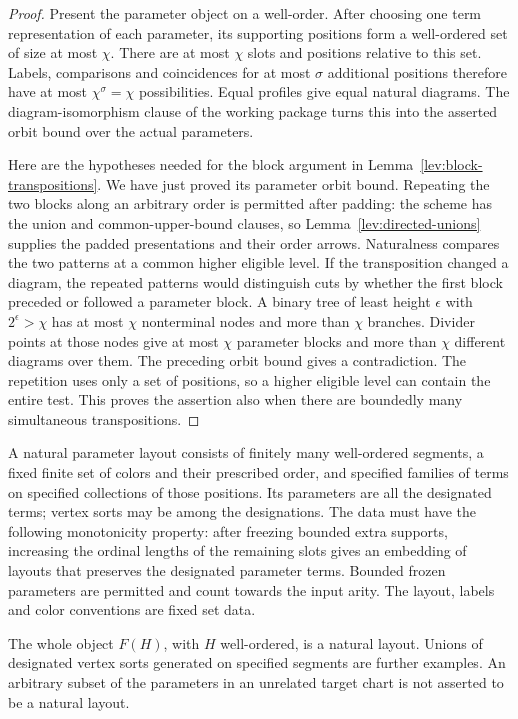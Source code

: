 \begin{proof}
Present the parameter object on a well-order.  After choosing one term
representation of each parameter, its supporting positions form a
well-ordered set of size at most $\chi$.  There are at most $\chi$ slots
and positions relative to this set.  Labels, comparisons and coincidences
for at most $\sigma$ additional positions therefore have at most
$\chi^\sigma=\chi$ possibilities.  Equal profiles give equal natural
diagrams.  The diagram-isomorphism clause of the working package turns
this into the asserted orbit bound over the actual parameters.

Here are the hypotheses needed for the block argument in
Lemma~\ref{lev:block-transpositions}.  We have just proved its parameter
orbit bound.  Repeating the two blocks along an arbitrary order is
permitted after padding: the scheme has the union and common-upper-bound
clauses, so Lemma~\ref{lev:directed-unions} supplies the padded
presentations and their order arrows.  Naturalness compares the two
patterns at a common higher eligible level.  If the transposition changed
a diagram, the repeated patterns would distinguish cuts by whether the
first block preceded or followed a parameter block.  A binary tree of
least height $\epsilon$ with $2^\epsilon>\chi$ has at most $\chi$
nonterminal nodes and more than $\chi$ branches.  Divider points at those
nodes give at most $\chi$ parameter blocks and more than $\chi$ different
diagrams over them.  The preceding orbit bound gives a contradiction.
The repetition uses only a set of positions, so a higher eligible level
can contain the entire test.  This proves the assertion also when there
are boundedly many simultaneous transpositions.
\end{proof}

\begin{definition}
\label{calc:natural-layout}
A natural parameter layout consists of finitely many well-ordered
segments, a fixed finite set of colors and their prescribed order, and
specified families of terms on specified collections of those positions.
Its parameters are all the designated terms; vertex sorts may be among
the designations.  The data must have the following monotonicity
property: after freezing bounded extra supports, increasing the ordinal
lengths of the remaining slots gives an embedding of layouts that
preserves the designated parameter terms.  Bounded frozen parameters
are permitted and count towards the input arity.  The layout, labels and
color conventions are fixed set data.

The whole object $F(H)$, with $H$ well-ordered, is a natural layout.
Unions of designated vertex sorts generated on specified segments are
further examples.  An arbitrary subset of the parameters in an unrelated
target chart is not asserted to be a natural layout.
\end{definition}

